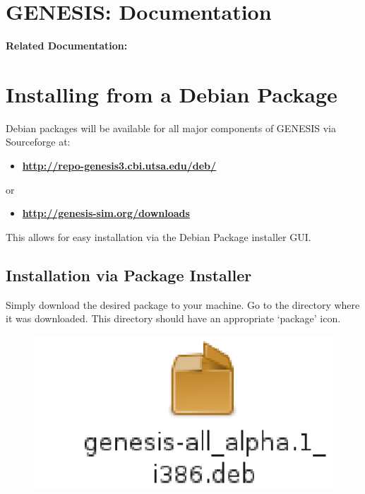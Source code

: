 \documentclass[12pt]{article}
\begin{document}
\section*{GENESIS: Documentation}

{\bf Related Documentation:}

\section*{Installing from a Debian Package}

Debian packages will be available for all major components of GENESIS via Sourceforge at:
\begin{itemize}
   \item[]\href{http://repo-genesis3.cbi.utsa.edu/deb/}{\bf {http://repo-genesis3.cbi.utsa.edu/deb/}}
\end{itemize}
\noindent or
\begin{itemize}
   \item[]\href{http://genesis-sim.org/downloads}{\bf http://genesis-sim.org/downloads}
\end{itemize}
This allows for easy installation via the Debian Package installer GUI.


\subsection*{Installation via Package Installer}

Simply download the desired package to your machine. Go to the directory where it was downloaded. This directory should have an appropriate `package' icon.

\begin{figure}[h]
   \centering
   \includegraphics[scale=1]{figures/install-user-deb-icon.eps}
\end{figure}
\end{document}
